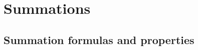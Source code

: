 \chapter{Summations}

\section{Summation formulas and properties}
\subsection{}

\subsection{}

\subsection{}

\setcounter{subsection}{6}
\subsection{}

